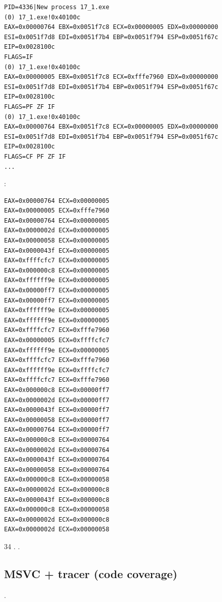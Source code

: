 \begin{lstlisting}
PID=4336|New process 17_1.exe
(0) 17_1.exe!0x40100c
EAX=0x00000764 EBX=0x0051f7c8 ECX=0x00000005 EDX=0x00000000
ESI=0x0051f7d8 EDI=0x0051f7b4 EBP=0x0051f794 ESP=0x0051f67c
EIP=0x0028100c
FLAGS=IF
(0) 17_1.exe!0x40100c
EAX=0x00000005 EBX=0x0051f7c8 ECX=0xfffe7960 EDX=0x00000000
ESI=0x0051f7d8 EDI=0x0051f7b4 EBP=0x0051f794 ESP=0x0051f67c
EIP=0x0028100c
FLAGS=PF ZF IF
(0) 17_1.exe!0x40100c
EAX=0x00000764 EBX=0x0051f7c8 ECX=0x00000005 EDX=0x00000000
ESI=0x0051f7d8 EDI=0x0051f7b4 EBP=0x0051f794 ESP=0x0051f67c
EIP=0x0028100c
FLAGS=CF PF ZF IF
...
\end{lstlisting}

  \AndENRU {} :

\begin{lstlisting}
EAX=0x00000764 ECX=0x00000005
EAX=0x00000005 ECX=0xfffe7960
EAX=0x00000764 ECX=0x00000005
EAX=0x0000002d ECX=0x00000005
EAX=0x00000058 ECX=0x00000005
EAX=0x0000043f ECX=0x00000005
EAX=0xffffcfc7 ECX=0x00000005
EAX=0x000000c8 ECX=0x00000005
EAX=0xffffff9e ECX=0x00000005
EAX=0x00000ff7 ECX=0x00000005
EAX=0x00000ff7 ECX=0x00000005
EAX=0xffffff9e ECX=0x00000005
EAX=0xffffff9e ECX=0x00000005
EAX=0xffffcfc7 ECX=0xfffe7960
EAX=0x00000005 ECX=0xffffcfc7
EAX=0xffffff9e ECX=0x00000005
EAX=0xffffcfc7 ECX=0xfffe7960
EAX=0xffffff9e ECX=0xffffcfc7
EAX=0xffffcfc7 ECX=0xfffe7960
EAX=0x000000c8 ECX=0x00000ff7
EAX=0x0000002d ECX=0x00000ff7
EAX=0x0000043f ECX=0x00000ff7
EAX=0x00000058 ECX=0x00000ff7
EAX=0x00000764 ECX=0x00000ff7
EAX=0x000000c8 ECX=0x00000764
EAX=0x0000002d ECX=0x00000764
EAX=0x0000043f ECX=0x00000764
EAX=0x00000058 ECX=0x00000764
EAX=0x000000c8 ECX=0x00000058
EAX=0x0000002d ECX=0x000000c8
EAX=0x0000043f ECX=0x000000c8
EAX=0x000000c8 ECX=0x00000058
EAX=0x0000002d ECX=0x000000c8
EAX=0x0000002d ECX=0x00000058
\end{lstlisting}

 34 .
.

\subsection{MSVC + tracer (code coverage)}

.

